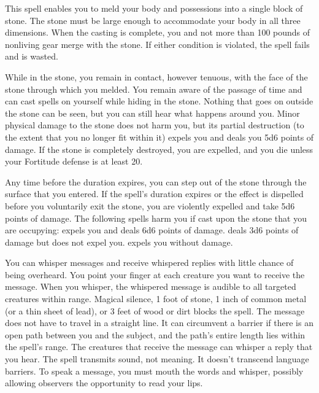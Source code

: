 \spelldur{\durlong}
\spelleffect This spell enables you to meld your body and possessions into a single block of stone. The stone must be large enough to accommodate your body in all three dimensions. When the casting is complete, you and not more than 100 pounds of nonliving gear merge with the stone. If either condition is violated, the spell fails and is wasted.
\par While in the stone, you remain in contact, however tenuous, with the face of the stone through which you melded. You remain aware of the passage of time and can cast spells on yourself while hiding in the stone. Nothing that goes on outside the stone can be seen, but you can still hear what happens around you. Minor physical damage to the stone does not harm you, but its partial destruction (to the extent that you no longer fit within it) expels you and deals you 5d6 points of damage. If the stone is completely destroyed, you are expelled, and you die unless your Fortitude defense is at least 20.
\par Any time before the duration expires, you can step out of the stone through the surface that you entered. If the spell's duration expires or the effect is dispelled before you voluntarily exit the stone, you are violently expelled and take 5d6 points of damage.
\spellnotes The following spells harm you if cast upon the stone that you are occupying:  expels you and deals 6d6 points of damage.  deals 3d6 points of damage but does not expel you.  expels you without damage.

\spelldur{\durlong}
\spelleffect You can whisper messages and receive whispered replies with little chance of being overheard. You point your finger at each creature you want to receive the message. When you whisper, the whispered message is audible to all targeted creatures within range. Magical silence, 1 foot of stone, 1 inch of common metal (or a thin sheet of lead), or 3 feet of wood or dirt blocks the spell. The message does not have to travel in a straight line. It can circumvent a barrier if there is an open path between you and the subject, and the path's entire length lies within the spell's range. The creatures that receive the message can whisper a reply that you hear. The spell transmits sound, not meaning. It doesn't transcend language barriers.
\spellnotes To speak a message, you must mouth the words and whisper, possibly allowing observers the opportunity to read your lips.

